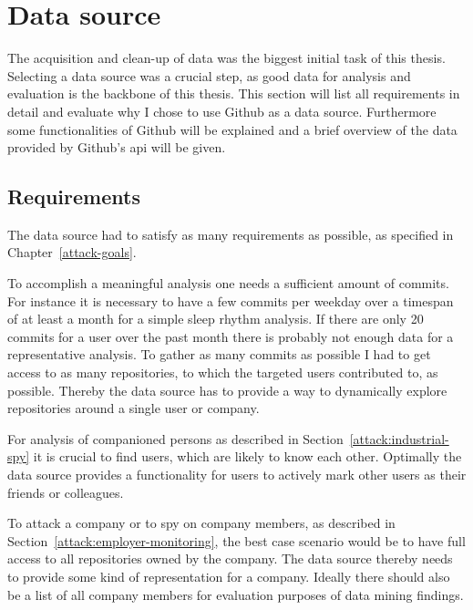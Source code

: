 \section{Data source}\label{data-source}
The acquisition and clean-up of data was the biggest initial task of this thesis.
Selecting a data source was a crucial step, as good data for analysis and evaluation is the backbone of this thesis.
This section will list all requirements in detail and evaluate why I chose to use Github as a data source.
Furthermore some functionalities of Github will be explained and a brief overview of the data provided by Github's \ac{api} will be given.


\subsection{Requirements}\label{requirements}
The data source had to satisfy as many requirements as possible, as specified in Chapter~\ref{attack-goals}.

To accomplish a meaningful analysis one needs a sufficient amount of commits.
For instance it is necessary to have a few commits per weekday over a timespan of at least a month for a simple sleep rhythm analysis.
If there are only 20 commits for a user over the past month there is probably not enough data for a representative analysis.
To gather as many commits as possible I had to get access to as many repositories, to which the targeted users contributed to, as possible.
Thereby the data source has to provide a way to dynamically explore repositories around a single user or company.

For analysis of companioned persons as described in Section~\ref{attack:industrial-spy} it is crucial to find users, which are likely to know each other.
Optimally the data source provides a functionality for users to actively mark other users as their friends or colleagues.

To attack a company or to spy on company members, as described in Section~\ref{attack:employer-monitoring}, the best case scenario would be to have full access to all repositories owned by the company.
The data source thereby needs to provide some kind of representation for a company.
Ideally there should also be a list of all company members for evaluation purposes of data mining findings.


